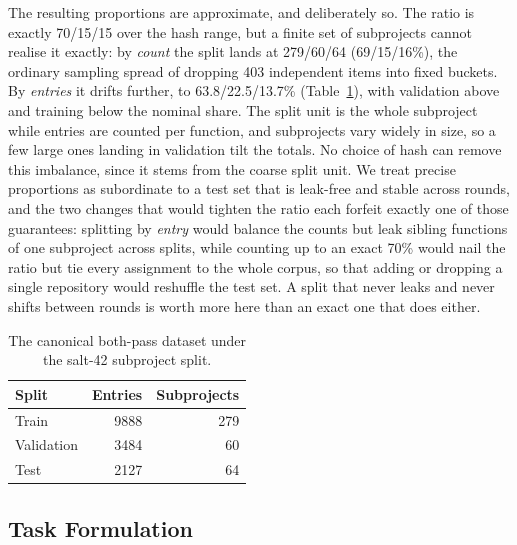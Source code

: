 The resulting proportions are approximate, and deliberately so.
The ratio is exactly 70/15/15 over the hash range, but a finite set of subprojects cannot realise it exactly: by \emph{count} the split lands at 279/60/64 (69/15/16\%), the ordinary sampling spread of dropping 403 independent items into fixed buckets.
By \emph{entries} it drifts further, to 63.8/22.5/13.7\% (Table~\ref{tab:llm-splits}), with validation above and training below the nominal share. The split unit is the whole subproject while entries are counted per function, and subprojects vary widely in size, so a few large ones landing in validation tilt the totals. No choice of hash can remove this imbalance, since it stems from the coarse split unit.
We treat precise proportions as subordinate to a test set that is leak-free and stable across rounds, and the two changes that would tighten the ratio each forfeit exactly one of those guarantees: splitting by \emph{entry} would balance the counts but leak sibling functions of one subproject across splits, while counting up to an exact 70\% would nail the ratio but tie every assignment to the whole corpus, so that adding or dropping a single repository would reshuffle the test set.
A split that never leaks and never shifts between rounds is worth more here than an exact one that does either.

\begin{table}[h]
\centering
\begin{tabular}{lrr}
\toprule
\textbf{Split} & \textbf{Entries} & \textbf{Subprojects} \\
\midrule
Train      & \num{9888} & 279 \\
Validation & \num{3484} & 60 \\
Test       & \num{2127} & 64 \\
\bottomrule
\end{tabular}
\caption{The canonical both-pass dataset under the salt-42 subproject split.}
\label{tab:llm-splits}
\end{table}


\subsection{Task Formulation}
\label{sec:llm-task}

